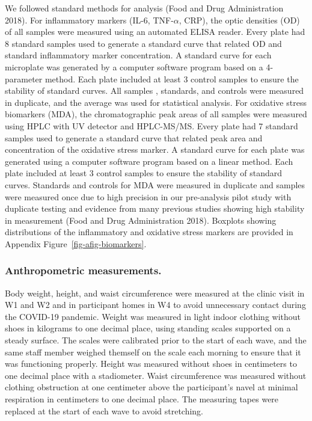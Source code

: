 \documentclass[
  letterpaper,
  DIV=11,
  numbers=noendperiod]{scrartcl}
\begin{document}
We followed standard methods for analysis (Food and Drug Administration
2018). For inflammatory markers (IL-6, TNF-\(\alpha\), CRP), the optic
densities (OD) of all samples were measured using an automated ELISA
reader. Every plate had 8 standard samples used to generate a standard
curve that related OD and standard inflammatory marker concentration. A
standard curve for each microplate was generated by a computer software
program based on a 4-parameter method. Each plate included at least 3
control samples to ensure the stability of standard curves. All samples
, standards, and controls were measured in duplicate, and
the average was used for statistical analysis. For oxidative stress
biomarkers (MDA), the chromatographic peak areas of all samples were
measured using HPLC with UV detector and HPLC-MS/MS. Every plate had 7
standard samples used to generate a standard curve that related peak
area and concentration of the oxidative stress marker. A standard curve
for each plate was generated using a computer software program based on
a linear method. Each plate included at least 3 control samples to
ensure the stability of standard curves. Standards and controls for MDA
were measured in duplicate and samples were measured once due to high
precision in our pre-analysis pilot study with duplicate
testing and evidence from many previous studies showing high stability
in measurement (Food and Drug Administration 2018). Boxplots showing
distributions of the inflammatory and oxidative stress markers are
provided in Appendix Figure~\ref{fig-afig-biomarkers}.

\subsubsection{Anthropometric
measurements.}\label{anthropometric-measurements.}

Body weight, height, and waist circumference were measured at the clinic
visit in W1 and W2 and in participant homes in W4 to avoid unnecessary
contact during the COVID-19 pandemic. Weight was measured in light
indoor clothing without shoes in kilograms to one decimal place, using
standing scales supported on a steady surface. The scales were
calibrated prior to the start of each wave, and the same staff member
weighed themself on the scale each morning to ensure that it was
functioning properly. Height was measured without shoes in centimeters
to one decimal place with a stadiometer. Waist circumference was
measured without clothing obstruction at one centimeter above the
participant's navel at minimal respiration in centimeters to one decimal
place. The measuring tapes were replaced at the start of each wave to
avoid stretching.
\end{document}

